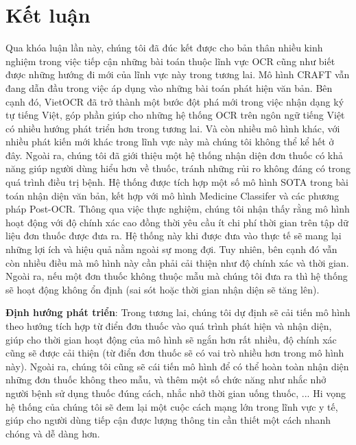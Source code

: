 \chapter{Kết luận}
\label{Chapter6}
Qua khóa luận lần này, chúng tôi đã đúc kết được cho bản thân nhiều kinh nghiệm trong việc tiếp cận những bài toán thuộc lĩnh vực OCR cũng như biết được những hướng đi mới của lĩnh vực này trong tương lai. Mô hình CRAFT \cite{baek2019character} vẫn đang dẫn đầu trong việc áp dụng vào những bài toán phát hiện văn bản. Bên cạnh đó, VietOCR \cite{VietOCR} đã trở thành một bước đột phá mới trong việc nhận dạng ký tự tiếng Việt, góp phần giúp cho những hệ thống OCR trên ngôn ngữ tiếng Việt có nhiều hướng phát triển hơn trong tương lai. Và còn nhiều mô hình khác, với nhiều phát kiến mới khác trong lĩnh vực này mà chúng tôi không thể kể hết ở đây. Ngoài ra, chúng tôi đã giới thiệu một hệ thống nhận diện đơn thuốc có khả năng giúp người
dùng hiểu hơn về thuốc, tránh những rủi ro không đáng có trong quá trình điều trị
bệnh. Hệ thống được tích hợp một số mô hình SOTA trong bài toán nhận diện văn bản, kết
hợp với mô hình Medicine Classifer và các phương pháp Post-OCR. Thông qua việc thực nghiệm, chúng tôi nhận thấy rằng mô hình hoạt động với độ chính xác cao đồng thời yêu
cầu ít chi phí thời gian trên tập dữ liệu đơn thuốc được đưa ra. Hệ thống này khi được đưa
vào thực tế sẽ mang lại những lợi ích và hiệu quả nằm ngoài sự mong đợi. Tuy nhiên, bên
cạnh đó vẫn còn nhiều điều mà mô hình này cần phải cải thiện như độ chính xác và thời
gian. Ngoài ra, nếu một đơn thuốc không thuộc mẫu mà chúng tôi đưa ra thì hệ thống sẽ
hoạt động không ổn định (sai sót hoặc thời gian nhận diện sẽ tăng lên).

\textbf{Định hướng phát triển}: Trong tương lai, chúng tôi dự định sẽ cải tiến mô hình theo hướng
tích hợp từ điển đơn thuốc vào quá trình phát hiện và nhận diện, giúp cho thời gian hoạt
động của mô hình sẽ ngắn hơn rất nhiều, độ chính xác cũng sẽ được cải thiện (từ điển đơn
thuốc sẽ có vai trò nhiều hơn trong mô hình này). Ngoài ra, chúng tôi cũng sẽ cái tiến mô
hình để có thể hoàn toàn nhận diện những đơn thuốc không theo mẫu, và thêm một số chức
năng như nhắc nhở người bệnh sử dụng thuốc đúng cách, nhắc nhở thời gian uống thuốc,
... Hi vọng hệ thống của chúng tôi sẽ đem lại một cuộc cách mạng lớn trong lĩnh vực y tế,
giúp cho người dùng tiếp cận được lượng thông tin cần thiết một cách nhanh chóng và dễ
dàng hơn.